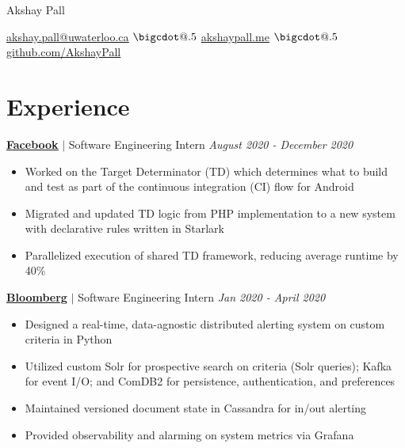 \documentclass[paper=a4,fontsize=15pt]{scrartcl}
\makeatletter
\newcommand*\bigcdot{\mathpalette\bigcdot@{.5}}
\newcommand*\bigcdot@[2]{\mathbin{\vcenter{\hbox{\scalebox{#2}{$\m@th#1\bullet$}}}}}
\newcommand{\smolboispace}{\vspace*{0.1em}}
\newcommand{\halfspace}{\vspace*{0.5em}}
\newcommand{\bighalfspace}{\vspace*{0.75em}}
\newcommand{\http}[1]{\href{http://#1}{\ul{#1}}}
\newcommand{\https}[1]{\href{https://#1}{\ul{#1}}}
\newcommand{\email}[1]{\href{mailto:#1}{\ul{#1}}}
\makeatother
\begin{document}
\begin{center}
  {\fontsize{35}{40}\selectfont Akshay Pall \par}
  \halfspace %
  \smolboispace
  \smolboispace

  {\normalsize
    \email{akshay.pall@uwaterloo.ca}
    $\bigcdot$ \http{akshaypall.me}
    $\bigcdot$ \https{github.com/AkshayPall}
    \par}
\end{center}

 \section*{Experience}{}
\normalsize
\noindent \href{https://facebook.com}{\textbf{\ul{Facebook}}}
$\vert$ \small Software Engineering Intern
{\hfill \footnotesize \textit{August 2020 - December 2020}}
\begin{itemize}[noitemsep,leftmargin=20pt,label=\raisebox{0.25ex}{\tiny$\bullet$},topsep=5pt]
  \small
 
  \item Worked on the Target Determinator (TD) which determines what to build and test as part of the continuous integration (CI) flow for Android

  \item Migrated and updated TD logic from PHP implementation to a new system with declarative rules written in Starlark
  
  \item Parallelized execution of shared TD framework, reducing average runtime by 40\% 
    
\end{itemize}

\bighalfspace
\normalsize
\noindent \href{https://bloomberg.com}{\textbf{\ul{Bloomberg}}}
$\vert$ \small Software Engineering Intern
{\hfill \footnotesize \textit{Jan 2020 - April 2020}}
\begin{itemize}[noitemsep,leftmargin=20pt,label=\raisebox{0.25ex}{\tiny$\bullet$},topsep=5pt]
  \small
 
  \item Designed a real-time, data-agnostic distributed alerting system on custom criteria in Python
    
  \item Utilized custom Solr for prospective search on criteria (Solr queries); Kafka for event I/O; and ComDB2 for persistence, authentication, and preferences

  \item Maintained versioned document state in Cassandra for in/out alerting
  
  \item Provided observability and alarming on system metrics via Grafana
  
\end{itemize}
\end{document}
